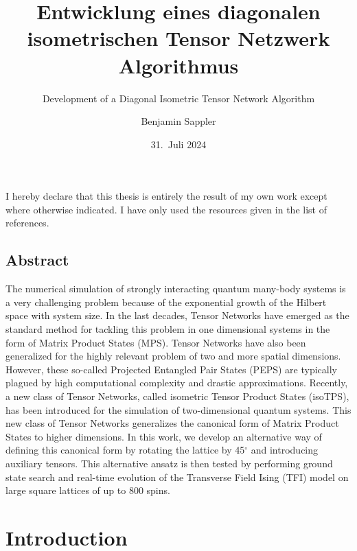 \documentclass[encoding=utf8,british]{template/thesis}
\title{Entwicklung eines diagonalen isometrischen Tensor Netzwerk Algorithmus}
\subtitle{Development of a Diagonal Isometric Tensor Network Algorithm}
\author{Benjamin Sappler}
\date{31.~Juli 2024}
\begin{document}
	\frontmatter
	\maketitle
	
	\newpage
	\begin{refsection}
	\thispagestyle{empty}
	
	\null\vfill
	\raggedright\noindent
	I hereby declare that this thesis is entirely the result of my own work except where otherwise indicated. I have only used the resources given in the list of references. \par
	\vspace{2cm}
	\noindent
	\par
	
	\newpage
	\thispagestyle{empty}
	
	\justifying
	
	\section*{Abstract}
	The numerical simulation of strongly interacting quantum many-body systems is a very challenging problem because of the exponential growth of the Hilbert space with system size. In the last decades, Tensor Networks have emerged as the standard method for tackling this problem in one dimensional systems in the form of Matrix Product States (MPS). Tensor Networks have also been generalized for the highly relevant problem of two and more spatial dimensions. However, these so-called Projected Entangled Pair States (PEPS) are typically plagued by high computational complexity and drastic approximations. Recently, a new class of Tensor Networks, called isometric Tensor Product States (isoTPS), has been introduced for the simulation of two-dimensional quantum systems. This new class of Tensor Networks generalizes the canonical form of Matrix Product States to higher dimensions. In this work, we develop an alternative way of defining this canonical form by rotating the lattice by 45$^\circ$ and introducing auxiliary tensors. This alternative ansatz is then tested by performing ground state search and real-time evolution of the Transverse Field Ising (TFI) model on large square lattices of up to 800 spins.
	
	\tableofcontents
	\thispagestyle{empty}
	
	\mainmatter
	
	\chapter{Introduction}
	\label{chap:introduction}
	
	

\end{refsection}
\end{document}

